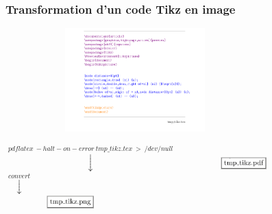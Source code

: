\documentclass{beamer}
\begin{document}
\begin{frame}
\frametitle{Transformation d'un code Tikz en image}
\includegraphics[width=10cm, height=4cm]{img/c1.png} \\
\begin{center}
$\overset{pdflatex\ -halt-on-error\ tmp\_tikz.tex\ >\ /dev/null }{\downarrow}$
\includegraphics[width=5cm, height=0.5cm]{img/re1.png} \\
$\overset{convert}{\downarrow}$ \\
\includegraphics[width=5cm, height=0.5cm]{img/re2.png} \\
\end{center}

\end{frame}
\end{document}

